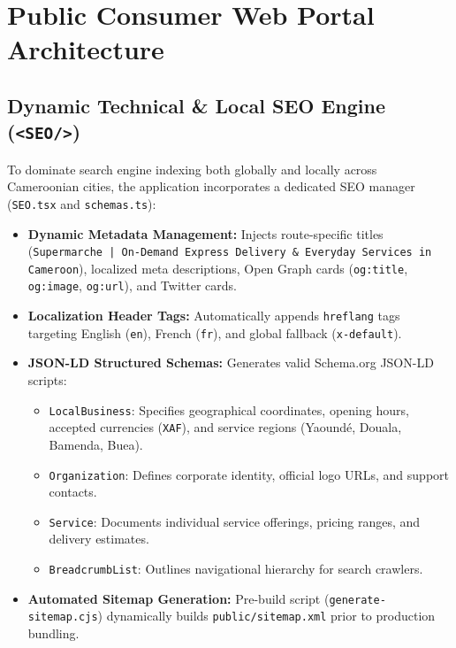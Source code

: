 \documentclass[11pt,a4paper]{article}
\begin{document}
\newpage

\section{Public Consumer Web Portal Architecture}

\subsection{Dynamic Technical \& Local SEO Engine (\texttt{<SEO/>})}
To dominate search engine indexing both globally and locally across Cameroonian cities, the application incorporates a dedicated SEO manager (\texttt{SEO.tsx} and \texttt{schemas.ts}):
\begin{itemize}
    \item \textbf{Dynamic Metadata Management:} Injects route-specific titles (\texttt{Supermarche | On-Demand Express Delivery \& Everyday Services in Cameroon}), localized meta descriptions, Open Graph cards (\texttt{og:title}, \texttt{og:image}, \texttt{og:url}), and Twitter cards.
    \item \textbf{Localization Header Tags:} Automatically appends \texttt{hreflang} tags targeting English (\texttt{en}), French (\texttt{fr}), and global fallback (\texttt{x-default}).
    \item \textbf{JSON-LD Structured Schemas:} Generates valid Schema.org JSON-LD scripts:
    \begin{itemize}
        \item \texttt{LocalBusiness}: Specifies geographical coordinates, opening hours, accepted currencies (\texttt{XAF}), and service regions (Yaound\'e, Douala, Bamenda, Buea).
        \item \texttt{Organization}: Defines corporate identity, official logo URLs, and support contacts.
        \item \texttt{Service}: Documents individual service offerings, pricing ranges, and delivery estimates.
        \item \texttt{BreadcrumbList}: Outlines navigational hierarchy for search crawlers.
    \end{itemize}
    \item \textbf{Automated Sitemap Generation:} Pre-build script (\texttt{generate-sitemap.cjs}) dynamically builds \texttt{public/sitemap.xml} prior to production bundling.
\end{itemize}
\end{document}
